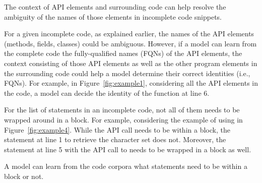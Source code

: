 \begin{Observation} 
The context of API elements and surrounding code can help resolve the
ambiguity of the names of those elements in incomplete code snippets.
\end{Observation}

For a given incomplete code, as explained earlier, the names of the
API elements (methods, fields, classes) could be ambiguous.  However,
if a model can learn from the complete code the fully-qualified names
(FQNs) of the API elements, the context consisting of those API
elements as well as the other program elements in the surrounding code
could help a model determine their correct identities (i.e.,
FQNs). For example, in Figure~\ref{fig:example1}, considering all the
API elements in the code, a model can decide
 the identity of the 
function at line 6.


For the list of statements in an incomplete code, not all of them
needs to be wrapped around in a  block. For example,
considering the example of using  in
Figure~\ref{fig:example4}. While the API call
 needs to be within a
 block, the statement at line 1 to retrieve the
character set does not. Moreover, the statement at line 5 with the API
call to  needs to be wrapped in a 
block as well.



\begin{Observation} 
  A model can learn from the code corpora what statements need to be
  within a  block or not.
\end{Observation}
